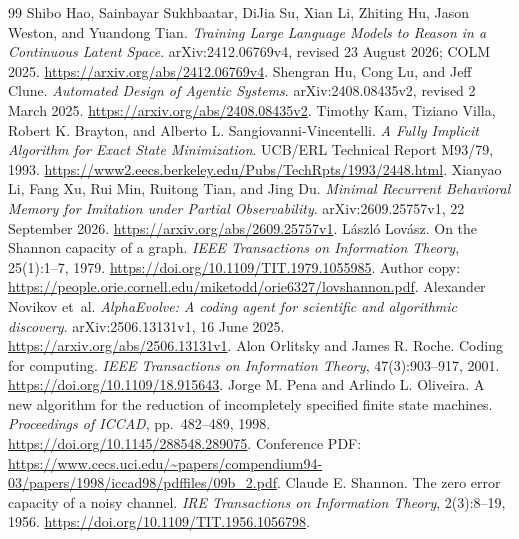 \documentclass[11pt,letterpaper]{article}
\theoremstyle{remark}\newtheorem{remark}{Remark}[section]
\begin{document}
\begin{thebibliography}{99}
Shibo Hao, Sainbayar Sukhbaatar, DiJia Su, Xian Li, Zhiting Hu, Jason Weston, and Yuandong Tian. \emph{Training Large Language Models to Reason in a Continuous Latent Space}. arXiv:2412.06769v4, revised 23 August 2026; COLM 2025. \url{https://arxiv.org/abs/2412.06769v4}.
Shengran Hu, Cong Lu, and Jeff Clune. \emph{Automated Design of Agentic Systems}. arXiv:2408.08435v2, revised 2 March 2025. \url{https://arxiv.org/abs/2408.08435v2}.
Timothy Kam, Tiziano Villa, Robert K. Brayton, and Alberto L. Sangiovanni-Vincentelli. \emph{A Fully Implicit Algorithm for Exact State Minimization}. UCB/ERL Technical Report M93/79, 1993. \url{https://www2.eecs.berkeley.edu/Pubs/TechRpts/1993/2448.html}.
Xianyao Li, Fang Xu, Rui Min, Ruitong Tian, and Jing Du. \emph{Minimal Recurrent Behavioral Memory for Imitation under Partial Observability}. arXiv:2609.25757v1, 22 September 2026. \url{https://arxiv.org/abs/2609.25757v1}.
László Lovász. On the Shannon capacity of a graph. \emph{IEEE Transactions on Information Theory}, 25(1):1--7, 1979. \url{https://doi.org/10.1109/TIT.1979.1055985}. Author copy: \url{https://people.orie.cornell.edu/miketodd/orie6327/lovshannon.pdf}.
Alexander Novikov et~al. \emph{AlphaEvolve: A coding agent for scientific and algorithmic discovery}. arXiv:2506.13131v1, 16 June 2025. \url{https://arxiv.org/abs/2506.13131v1}.
Alon Orlitsky and James R. Roche. Coding for computing. \emph{IEEE Transactions on Information Theory}, 47(3):903--917, 2001. \url{https://doi.org/10.1109/18.915643}.
Jorge M. Pena and Arlindo L. Oliveira. A new algorithm for the reduction of incompletely specified finite state machines. \emph{Proceedings of ICCAD}, pp.~482--489, 1998. \url{https://doi.org/10.1145/288548.289075}. Conference PDF: \url{https://www.cecs.uci.edu/~papers/compendium94-03/papers/1998/iccad98/pdffiles/09b_2.pdf}.
Claude E. Shannon. The zero error capacity of a noisy channel. \emph{IRE Transactions on Information Theory}, 2(3):8--19, 1956. \url{https://doi.org/10.1109/TIT.1956.1056798}.
\end{thebibliography}
\end{document}
